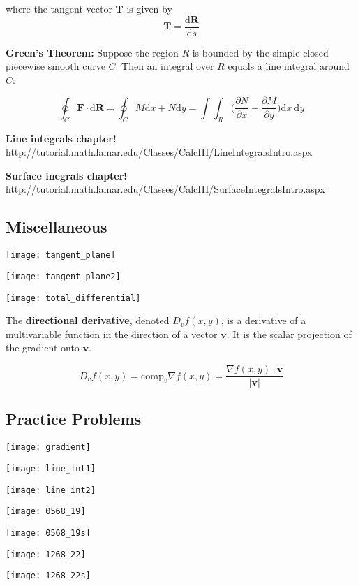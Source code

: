 where the tangent vector \(\boldsymbol{T}\) is given by \[\boldsymbol{T} = \frac{\text{d}\boldsymbol{R}}{\text{d}s}\]

\textbf{Green's Theorem:} Suppose the region \(R\) is bounded by the simple closed piecewise smooth curve \(C\). Then an integral over \(R\) equals a line integral around \(C\):

\[
\oint_C \boldsymbol{F} \cdot \text{d}\boldsymbol{R} = \oint_C M \text{d}x + N \text{d}y = \int \int_R \bigg( \frac{\partial N}{\partial x} - \frac{\partial M}{\partial y} \bigg) \text{d}x \ \text{d}y
\]

\textbf{Line integrals chapter!} http://tutorial.math.lamar.edu/Classes/CalcIII/LineIntegralsIntro.aspx

\textbf{Surface inegrals chapter!} http://tutorial.math.lamar.edu/Classes/CalcIII/SurfaceIntegralsIntro.aspx

\subsection{Miscellaneous}

\texttt{[image: tangent\_plane]}

\texttt{[image: tangent\_plane2]}

\texttt{[image: total\_differential]}

The \textbf{directional derivative}, denoted \(D_v f(x, y)\), is a derivative of a multivariable function in the direction of a vector \(\boldsymbol{v}\). It is the scalar projection of the gradient onto \(\boldsymbol{v}\).

\[
D_v f(x, y) = \text{comp}_v \nabla f(x, y) = \frac{\nabla f(x, y) \cdot \boldsymbol{v}}{|\boldsymbol{v}|}
\]

\subsection{Practice Problems}

\texttt{[image: gradient]}

\texttt{[image: line\_int1]}

\texttt{[image: line\_int2]}

\texttt{[image: 0568\_19]}

\texttt{[image: 0568\_19s]}

\texttt{[image: 1268\_22]}

\texttt{[image: 1268\_22s]}

